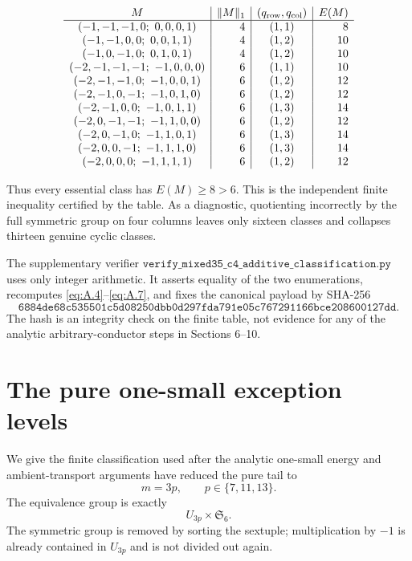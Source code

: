 \documentclass[11pt]{amsart}
\numberwithin{theorem}{section}
\theoremstyle{remark}
\numberwithin{equation}{section}
\begin{document}
\[
\begin{array}{c|r|c|r}
M&\|M\|_1&(q_{\rm row},q_{\rm col})&E(M)\\\hline
(-1,-1,-1,0;\ 0,0,0,1) & 4 & (1,1) & 8\\
(-1,-1,0,0;\ 0,0,1,1) & 4 & (1,2) & 10\\
(-1,0,-1,0;\ 0,1,0,1) & 4 & (1,2) & 10\\
(-2,-1,-1,-1;\ -1,0,0,0) & 6 & (1,1) & 10\\
(-2,-1,-1,0;\ -1,0,0,1) & 6 & (1,2) & 12\\
(-2,-1,0,-1;\ -1,0,1,0) & 6 & (1,2) & 12\\
(-2,-1,0,0;\ -1,0,1,1) & 6 & (1,3) & 14\\
(-2,0,-1,-1;\ -1,1,0,0) & 6 & (1,2) & 12\\
(-2,0,-1,0;\ -1,1,0,1) & 6 & (1,3) & 14\\
(-2,0,0,-1;\ -1,1,1,0) & 6 & (1,3) & 14\\
(-2,0,0,0;\ -1,1,1,1) & 6 & (1,2) & 12\\
\end{array}
\]

Thus every essential class has \(E(M)\ge8>6\). This is the independent
finite inequality certified by the table. As a diagnostic, quotienting
incorrectly by the full symmetric
group on four columns leaves only sixteen classes and collapses thirteen
genuine cyclic classes.

The supplementary verifier
\( \texttt{verify\_mixed35\_c4\_additive\_classification.py} \)
uses only integer arithmetic.  It asserts equality of the two enumerations,
recomputes \eqref{eq:A.4}--\eqref{eq:A.7}, and fixes the canonical payload by SHA-256
\[
\texttt{6884de68c535501c5d08250dbb0d297fda791e05c767291166bce208600127dd}.
\]
The hash is an integrity check on the finite table, not evidence for any of
the analytic arbitrary-conductor steps in Sections 6--10.

\section{The pure one-small exception levels}\label{sec:appB}

We give the finite classification used after the analytic one-small energy
and ambient-transport arguments have reduced the pure tail to
\[
 m=3p,\qquad p\in\{7,11,13\}.
 \tag{B.1}\label{eq:B.1}
\]
The equivalence group is exactly
\[
 U_{3p}\times\mathfrak S_6.
 \tag{B.2}\label{eq:B.2}
\]
The symmetric group is removed by sorting the sextuple; multiplication by
\(-1\) is already contained in \(U_{3p}\) and is not divided out again.
\end{document}
